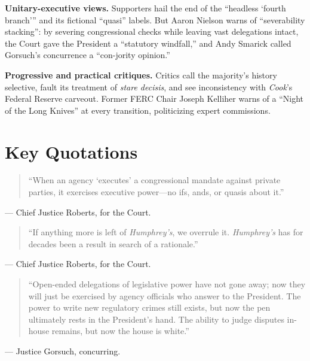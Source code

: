\documentclass[12pt]{article}
\begin{document}
\textbf{Unitary-executive views.} Supporters hail the end of the ``headless `fourth branch''' and its fictional ``quasi'' labels. But Aaron Nielson warns of ``severability stacking'': by severing congressional checks while leaving vast delegations intact, the Court gave the President a ``statutory windfall,'' and Andy Smarick called Gorsuch's concurrence a ``con-jority opinion.''

\textbf{Progressive and practical critiques.} Critics call the majority's history selective, fault its treatment of \textit{stare decisis}, and see inconsistency with \textit{Cook}'s Federal Reserve carveout. Former FERC Chair Joseph Kelliher warns of a ``Night of the Long Knives'' at every transition, politicizing expert commissions.

\section{Key Quotations}

\begin{quote}
``When an agency `executes' a congressional mandate against private parties, it exercises executive power---no ifs, ands, or quasis about it.''
\end{quote}
\noindent --- Chief Justice Roberts, for the Court.

\begin{quote}
``If anything more is left of \textit{Humphrey's}, we overrule it. \textit{Humphrey's} has for decades been a result in search of a rationale.''
\end{quote}
\noindent --- Chief Justice Roberts, for the Court.

\begin{quote}
``Open-ended delegations of legislative power have not gone away; now they will just be exercised by agency officials who answer to the President. The power to write new regulatory crimes still exists, but now the pen ultimately rests in the President's hand. The ability to judge disputes in-house remains, but now the house is white.''
\end{quote}
\noindent --- Justice Gorsuch, concurring.
\end{document}
